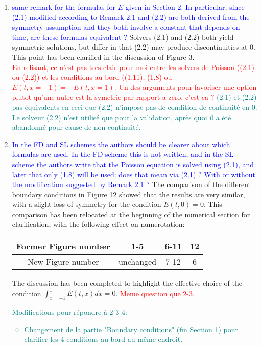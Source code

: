 \documentclass{article}
\begin{document}
\begin{enumerate}
{    }
    \item \textcolor{blue}{same remark for the formulas for $E$ given in Section 2. In particular,
since (2.1) modified according to Remark 2.1 and (2.2) are both derived from the symmetry assumption and they both involve a constant that depends on time, are these formulas equivalent ?} Solvers (2.1) and (2.2) both yield symmetric solutions, but differ in that (2.2) may produce discontinuities at 0. This point has been clarified in the discussion of Figure 3. \\ 
\textcolor{red}{En relisant, ce n'est pas tres clair pour moi entre les solvers de Poisson ((2.1) ou (2.2)) et les conditions au bord 
((1.11), (1.8) ou $E(t, x=-1)=-E(t, x=1)$. Un des arguments pour favoriser une option plutot qu'une autre est la symetrie par rapport a zero, c'est ca ?   } \textcolor{teal}{(2.1) et (2.2) pas équivalents en ceci que (2.2) n'impose pas de condition de continuité en 0. Le solveur (2.2) n'est utilisé que pour la validation, après quoi il a été abandonné pour cause de non-continuité.}
    \item \textcolor{blue}{In the FD and SL schemes the authors should be clearer about which formulas are used.
In the FD scheme this is not written, and in the SL scheme the authors write that
the Poisson equation is solved using (2.1), and later that only (1.8) will be used:
does that mean via (2.1) ? With or without the modification suggested by Remark 2.1 ? } 
The comparison of the different boundary conditions in Figure 12 showed that the results are very similar, with a slight loss of symmetry for the condition $E(t,0)=0$. This comparison has been relocated at the beginning of the numerical section for clarification, with the following effect on numerotation: 
\begin{center}
\begin{tabular}{|c|c|c|c|}
	\hline
	Former Figure number & 1-5 & 6-11 & 12 \\
	\hline
	New Figure number & unchanged & 7-12 & 6 \\
	\hline
\end{tabular}
\end{center}
The discussion has been completed to highlight the effective choice  of the condition $\int_{x=-1}^{1} E(t,x) dx = 0$.
\textcolor{red}{Meme question que 2-3.} \textcolor{teal}{Modifications pour répondre à 2-3-4: 
\begin{itemize}
\item Changement de la partie "Boundary conditions" (fin Section 1) pour clarifier les 4 conditions au bord au même endroit. 

\end{itemize}}
\end{enumerate}
\end{document}
